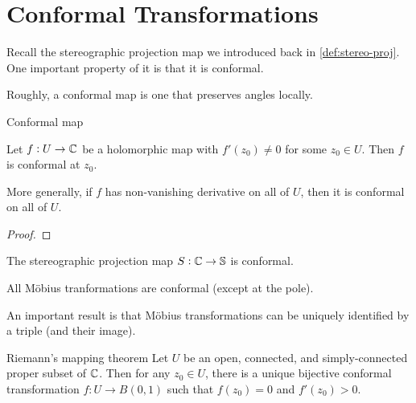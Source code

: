 \documentclass{styles/tufte}
\begin{document}
\section{Conformal Transformations}

Recall the stereographic projection map we introduced back in \cref{def:stereo-proj}. One important property of it is that it is conformal.

Roughly, a conformal map is one that preserves angles locally.

\begin{definition}{Conformal map}{}
  
\end{definition}

\begin{proposition}{}{}
  Let $f: U \to \mathbb{C}$ be a holomorphic map with $f'(z_0) \neq 0$ for some $z_0 \in U$. Then $f$ is conformal at $z_0$.
  
  More generally, if $f$ has non-vanishing derivative on all of $U$, then it is conformal on all of $U$.
\end{proposition}
\begin{proof}
  
\end{proof}

\begin{proposition}{}{}
  The stereographic projection map $S: \mathbb{C} \to \mathbb{S}$ is conformal.
\end{proposition}

\begin{proposition}{}{}
  All M\"obius tranformations are conformal (except at the pole).
\end{proposition}

An important result is that M\"obius transformations can be uniquely identified by a triple (and their image).

\begin{theorem}{Riemann's mapping theorem}{}
  Let $U$ be an open, connected, and simply-connected proper subset of $\mathbb{C}$. Then for any $z_0 \in U$, there is a unique bijective conformal transformation $f: U \to B(0, 1)$ such that $f(z_0) = 0$ and $f'(z_0) > 0$.
\end{theorem}
\end{document}
